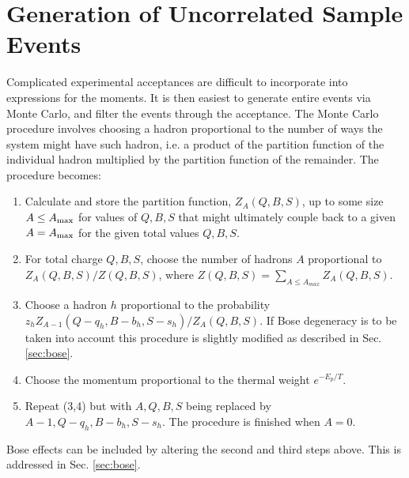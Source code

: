 

\section{Generation of Uncorrelated Sample Events}\label{sec:theoryMC}

Complicated experimental acceptances are difficult to incorporate into expressions for the moments. It is then easiest to generate entire events via Monte Carlo, and filter the events through the acceptance. The Monte Carlo procedure involves choosing a hadron proportional to the number of ways the system might have such hadron, i.e. a product of the partition function of the individual hadron multiplied by the partition function of the remainder. The procedure becomes:
\begin{enumerate}
\item Calculate and store the partition function, $Z_A(Q,B,S)$, up to some size $A\le A_{\rm max}$ for values of  $Q,B,S$ that might ultimately couple back to a given $A=A_{\rm max}$ for the given total values $Q,B,S$. 
\item For total charge $Q,B,S$, choose the number of hadrons $A$ proportional to $Z_A(Q,B,S)/Z(Q,B,S)$, where $Z(Q,B,S) = \sum_{A\le A_{max}}Z_A(Q,B,S)$.
\item Choose a hadron $h$ proportional to the probability $z_hZ_{A-1}(Q-q_h,B-b_h,S-s_h)/Z_A(Q,B,S)$. If Bose degeneracy is to be taken into account this procedure is slightly modified as described in Sec. \ref{sec:bose}.
\item Choose the momentum proportional to the thermal weight $e^{-E_p/T}$.
\item Repeat (3,4) but with $A,Q,B,S$ being replaced by $A-1,Q-q_h,B-b_h,S-s_h$. The procedure is finished when $A=0$.
\end{enumerate}
Bose effects can be included by altering the second and third steps above. This is addressed in Sec. \ref{sec:bose}.


